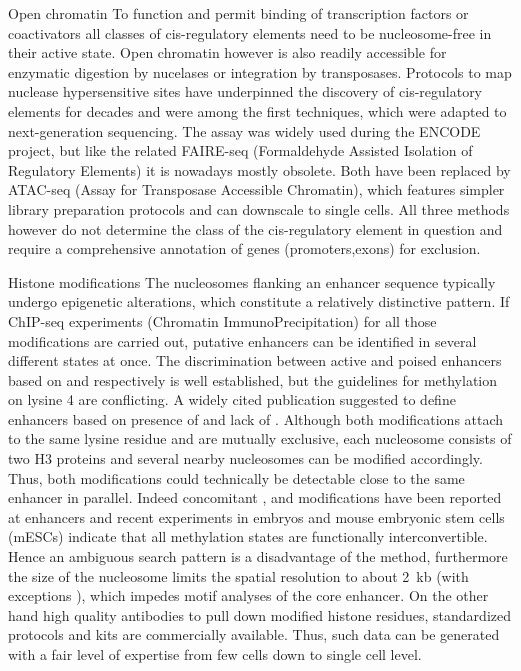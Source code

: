\begin{mydescription}{0.5cm}
	\item[Open chromatin] To function and permit binding of transcription factors or coactivators all classes of cis-regulatory elements need to be nucleosome-free in their active state. Open chromatin however is also readily accessible for enzymatic digestion by nucelases or integration by transposases. Protocols to map nuclease hypersensitive sites\cite{Stewart1991} have underpinned the discovery of cis-regulatory elements for decades and were among the first techniques, which were adapted to next-generation sequencing\cite{Crawford2006}. The assay was widely used during the ENCODE project\cite{Thurman2012}, but like the related FAIRE-seq (Formaldehyde Assisted Isolation of Regulatory Elements)\cite{Giresi2007} it is nowadays mostly obsolete. Both have been replaced by ATAC-seq (Assay for Transposase Accessible Chromatin)\cite{Buenrostro2013}, which features simpler library preparation protocols and can downscale to single cells\cite{Buenrostro2015,Cusanovich2015}. All three methods however do not determine the class of the cis-regulatory element in question and require a comprehensive annotation of genes (promoters,exons) for exclusion. 
	\item[Histone modifications] The nucleosomes flanking an enhancer sequence typically undergo epigenetic alterations, which constitute a relatively distinctive pattern. If ChIP-seq experiments (Chromatin ImmunoPrecipitation)\cite{Barski2007,Johnson2007,Mikkelsen2007} for all those modifications are carried out, putative enhancers can be identified in several different states at once. The discrimination between active and poised enhancers based on \histwentysevenac and \histwentyseventhree respectively\cite{Zentner2011} is well established, but the guidelines for methylation on lysine 4 are conflicting. A widely cited publication suggested to define enhancers based on presence of \hisfourone and lack of \hisfourthree\cite{Heintzman2007}. Although both modifications attach to the same lysine residue and are mutually exclusive, each nucleosome consists of two H3 proteins and several nearby nucleosomes can be modified accordingly. Thus, both modifications could technically be detectable close to the same enhancer in parallel. Indeed concomitant \hisfourone, \hisfourtwo and \hisfourthree modifications have been reported at enhancers\cite{Pekowska2011,KochAndrau2011} and recent experiments in  embryos and mouse embryonic stem cells (mESCs) indicate that all methylation states are functionally interconvertible\cite{Rickels2017a}. Hence an ambiguous search pattern is a disadvantage of the method, furthermore the size of the nucleosome limits the spatial resolution to about \SI{2}{kb} (with exceptions \cite{Rhee2011}), which impedes motif analyses of the core enhancer. On the other hand high quality antibodies to pull down modified histone residues, standardized protocols and kits are commercially available. Thus, such data can be generated with a fair level of expertise from few cells \cite{Lara-Astiaso2014} down to single cell level\cite{Rotem2015}. 

\end{mydescription}

